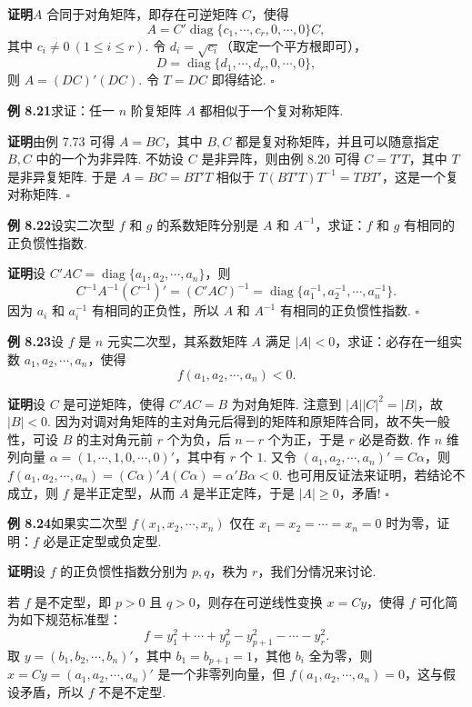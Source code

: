 \documentclass[UTF8, 12pt, fontset=fandol, oneside]{ctexart}
\begin{document}
\noindent\textbf{证明}\quad $A$ 合同于对角矩阵，即存在可逆矩阵 $C$，使得
\[
A=C'\operatorname{diag}\{c_1,\cdots,c_r,0,\cdots,0\}C,
\]
其中 $c_i\ne 0\ (1\le i\le r)$. 令 $d_i=\sqrt{c_i}$（取定一个平方根即可），
\[
D=\operatorname{diag}\{d_1,\cdots,d_r,0,\cdots,0\},
\]
则 $A=(DC)'(DC)$. 令 $T=DC$ 即得结论. $\ensuremath{\square}$

\noindent\textbf{例 8.21}\quad 求证：任一 $n$ 阶复矩阵 $A$ 都相似于一个复对称矩阵.

\noindent\textbf{证明}\quad 由例 7.73 可得 $A=BC$，其中 $B,C$ 都是复对称矩阵，并且可以随意指定 $B,C$ 中的一个为非异阵. 不妨设 $C$ 是非异阵，则由例 8.20 可得 $C=T'T$，其中 $T$ 是非异复矩阵. 于是 $A=BC=BT'T$ 相似于 $T(BT'T)T^{-1}=TBT'$，这是一个复对称矩阵. $\ensuremath{\square}$

\noindent\textbf{例 8.22}\quad 设实二次型 $f$ 和 $g$ 的系数矩阵分别是 $A$ 和 $A^{-1}$，求证：$f$ 和 $g$ 有相同的正负惯性指数.

\noindent\textbf{证明}\quad 设 $C'AC=\operatorname{diag}\{a_1,a_2,\cdots,a_n\}$，则
\[
C^{-1}A^{-1}(C^{-1})'=(C'AC)^{-1}=\operatorname{diag}\{a_1^{-1},a_2^{-1},\cdots,a_n^{-1}\}.
\]
因为 $a_i$ 和 $a_i^{-1}$ 有相同的正负性，所以 $A$ 和 $A^{-1}$ 有相同的正负惯性指数. $\ensuremath{\square}$

\noindent\textbf{例 8.23}\quad 设 $f$ 是 $n$ 元实二次型，其系数矩阵 $A$ 满足 $|A|<0$，求证：必存在一组实数 $a_1,a_2,\cdots,a_n$，使得
\[
f(a_1,a_2,\cdots,a_n)<0.
\]

\noindent\textbf{证明}\quad 设 $C$ 是可逆矩阵，使得 $C'AC=B$ 为对角矩阵. 注意到 $|A||C|^2=|B|$，故 $|B|<0$. 因为对调对角矩阵的主对角元后得到的矩阵和原矩阵合同，故不失一般性，可设 $B$ 的主对角元前 $r$ 个为负，后 $n-r$ 个为正，于是 $r$ 必是奇数. 作 $n$ 维列向量 $\alpha=(1,\cdots,1,0,\cdots,0)'$，其中有 $r$ 个 $1$. 又令 $(a_1,a_2,\cdots,a_n)'=C\alpha$，则 $f(a_1,a_2,\cdots,a_n)=(C\alpha)'A(C\alpha)=\alpha'B\alpha<0$. 也可用反证法来证明，若结论不成立，则 $f$ 是半正定型，从而 $A$ 是半正定阵，于是 $|A|\ge 0$，矛盾! $\ensuremath{\square}$

\noindent\textbf{例 8.24}\quad 如果实二次型 $f(x_1,x_2,\cdots,x_n)$ 仅在 $x_1=x_2=\cdots=x_n=0$ 时为零，证明：$f$ 必是正定型或负定型.

\noindent\textbf{证明}\quad 设 $f$ 的正负惯性指数分别为 $p,q$，秩为 $r$，我们分情况来讨论.

若 $f$ 是不定型，即 $p>0$ 且 $q>0$，则存在可逆线性变换 $x=Cy$，使得 $f$ 可化简为如下规范标准型：
\[
f=y_1^2+\cdots+y_p^2-y_{p+1}^2-\cdots-y_r^2.
\]
取 $y=(b_1,b_2,\cdots,b_n)'$，其中 $b_1=b_{p+1}=1$，其他 $b_i$ 全为零，则 $x=Cy=(a_1,a_2,\cdots,a_n)'$ 是一个非零列向量，但 $f(a_1,a_2,\cdots,a_n)=0$，这与假设矛盾，所以 $f$ 不是不定型.
\end{document}
